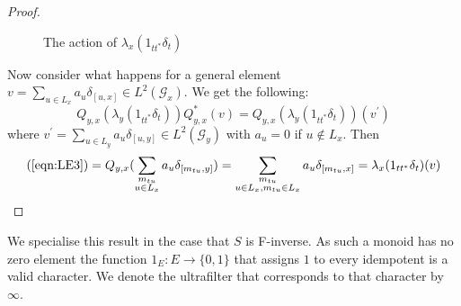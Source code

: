 \documentclass[11pt]{amsart}
\theoremstyle{plain}
\theoremstyle{definition}%
\theoremstyle{remark}%
\begin{document}
\begin{proof}
\begin{figure}
\caption{The action of $\lambda_{x}(1_{tt^{*}}\delta_{t})$}

\end{figure}

Now consider what happens for a general element $v = \sum_{u \in L_{x}} a_{u}\delta_{[u,x]} \in L^{2}(\mathcal{G}_{x})$. We get the following:
\begin{equation}\label{eqn:LE3}
Q_{y,x}(\lambda_{y}(1_{tt^{*}}\delta_{t}))Q_{y,x}^{*}(v)=Q_{y,x}(\lambda_{y}(1_{tt^{*}}\delta_{t}))(v^{'})
\end{equation}
where $v^{'}= \sum_{u \in L_{y}} a_{u}\delta_{[u,y]} \in L^{2}(\mathcal{G}_{y})$ with $a_{u}=0$ if $u \not \in L_{x}$. Then 
\begin{eqnarray*}
\mbox{(\ref{eqn:LE3})} = Q_{y,x}(\sum_{\substack{ m_{tu}\\ u \in L_{x}}} a_{u}\delta_{[m_{tu},y]})
=\sum_{\substack{ m_{tu}\\  u \in L_{x},m_{tu} \in L_{x}}}a_{u}\delta_{[m_{tu},x]}=\lambda_{x}(1_{tt^{*}}\delta_{t})(v)
\end{eqnarray*}
\end{proof}

We specialise this result in the case that $S$ is F-inverse. As such a monoid has no zero element the function $1_{E}: E \rightarrow \lbrace 0,1 \rbrace$ that assigns $1$ to every idempotent is a valid character. We denote the ultrafilter that corresponds to that character by $\infty$.
\end{document}

